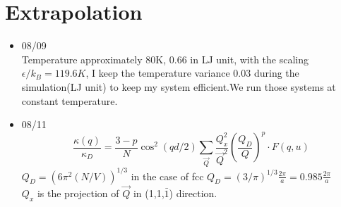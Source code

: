 \documentclass{article}
\begin{document}
\paragraph*{}
\section*{Extrapolation}
\begin{itemize}
\item \mbox{08/09}\\
Temperature approximately 80K, 0.66 in LJ unit, with the scaling $\epsilon/k_B=119.6K$, I keep the temperature variance 0.03 during the simulation(LJ unit) to keep my system efficient.We run those systems at constant temperature.
\item \mbox{08/11}\\
\begin{equation*}
\frac{\kappa(q)}{\kappa_D}=\frac{3-p}{N}\cos^2(qd/2)\sum\limits_{\vec{Q}} \frac{Q_x^2}{\vec{Q}^2}  (\frac{Q_D}{Q})^p\cdot F(q,u)
\end{equation*}
$Q_D=(6\pi^2(N/V))^{1/3}$ in the case of fcc $Q_D=(3/\pi)^{1/3}\frac{2\pi}{a}=0.985\frac{2\pi}{a}$\\
$Q_x$ is the projection of $\vec{Q}$ in (1,1,$\bar{1}$) direction.

\end{itemize}
\end{document}
